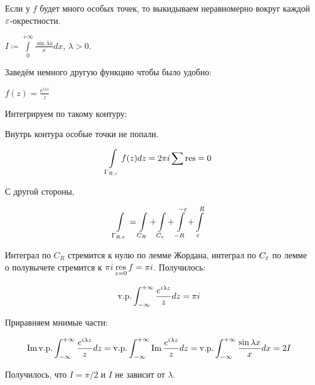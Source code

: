 \begin{observation}
    Если у $f$ будет много особых точек, то выкидываем неравномерно
    вокруг каждой $\varepsilon$-окрестности.
\end{observation}

\begin{example}
    $I \coloneqq \int\limits_0^{+\infty} \frac{\sin \lambda x}{x}dx$,
    $\lambda > 0$.

    Заведём немного другую функцию чтобы было удобно:

    $f(z) = \frac{e^{i\lambda z}}z$

    Интегрируем по такому контуру:

    \begin{center}
    \end{center}

    Внутрь контура особые точки не попали.

    \[
        \int\limits_{\Gamma_{R,\varepsilon}} f(z)dz = 2\pi i \sum\operatorname*{res} = 0
    \]

    С другой стороны,

    \[
        \int\limits_{\Gamma_{R,\varepsilon}}
        = \int\limits_{C_R} + \int\limits_{C_\varepsilon}
        + \int\limits_{-R}^{-\varepsilon} + \int\limits_{\varepsilon}^{R}
    \]

    Интеграл по $C_R$ стремится к нулю по лемме Жордана,
    интеграл по $C_\varepsilon$ по лемме о полувычете стремится к
    $\pi i \operatorname*{res}\limits_{z=0} f = \pi i$. Получилось:

    \[
        \mathrm{v. p. }\int_{-\infty}^{+\infty}
        \frac{e^{i\lambda z}}{z}dz = \pi i
    \]

    Приравняем мнимые части:

    \[
        \operatorname{Im} \mathrm{v. p. }\int_{-\infty}^{+\infty}
        \frac{e^{i\lambda z}}{z}dz
        = \mathrm{v. p. }\int_{-\infty}^{+\infty} \operatorname{Im}
        \frac{e^{i\lambda z}}{z}dz
        = \mathrm{v. p. }\int_{-\infty}^{+\infty}
        \frac{\sin \lambda x}{x}dx
        = 2I
    \]

    Получилось, что $I = \pi / 2$ и $I$ не зависит от $\lambda$.
\end{example}
\newpage
